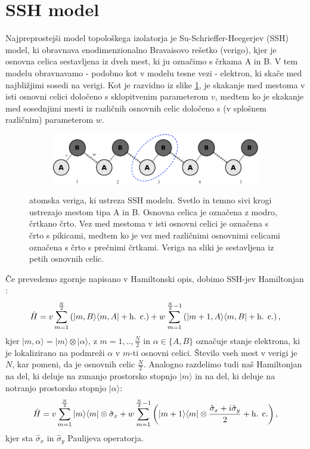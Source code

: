 \section{SSH model}
Najpreprostejši model topološkega izolatorja je Su-Schrieffer-Heegerjev (SSH) model, ki obravnava enodimenzionalno Bravaisovo rešetko (verigo), kjer je osnovna celica sestavljena iz dveh mest, ki ju označimo s črkama A in B. V tem modelu obravnavamo - podobno kot v modelu tesne vezi - elektron, ki skače med najbližjimi sosedi na verigi. Kot je razvidno iz slike \ref{fig:chain}, je skakanje med mestoma v isti osnovni celici določeno s sklopitvenim parameterom $v$, medtem ko je skakanje med sosednjimi mesti iz različnih osnovnih celic določeno s (v splošnem različnim) parameterom $w$.
\begin{figure}[H]
\centering
\begin{subfigure}{.9\textwidth}
\includegraphics[width=\linewidth]{Figures/MySSHChain.pdf}
\end{subfigure}
\caption{atomska veriga, ki ustreza SSH modelu. Svetlo in temno sivi krogi ustrezajo mestom tipa A in B. Osnovna celica je označena z modro, črtkano črto. Vez med mestoma v isti osnovni celici je označena s črto s pikicami, medtem ko je vez med različnimi osnovnimi celicami označena s črto s prečnimi črtkami. Veriga na sliki je sestavljena iz petih osnovnih celic. }
\label{fig:chain}
\end{figure}
Če prevedemo zgornje napisano v Hamiltonski opis, dobimo SSH-jev Hamiltonjan \cite{SSH}:
\begin{equation}
\hat{H} = v \sum_{m=1}^{\frac{N}{2}} \left( |m, B \rangle \langle m, A | + \textup{h. c.} \right) + w \sum_{m=1}^{\frac{N}{2}-1} \left( | m+1, A \rangle \langle m, B | + \textup{h. c.} \right),
\end{equation}
kjer $|m , \alpha \rangle = |m \rangle \otimes | \alpha \rangle$, z $m=1,.., \frac{N}{2}$ in $\alpha \in \{A,B\}$ označuje stanje elektrona, ki je lokalizirano na podmreži $\alpha$ v $m$-ti osnovni celici. Število vseh mest v verigi je $N$, kar pomeni, da je osnovnih celic $\frac{N}{2}$.  Analogno razdelimo tudi naš Hamiltonjan na del, ki deluje na zunanjo prostorsko stopnjo $|m \rangle$ in na del, ki deluje na notranjo prostorsko stopnjo $| \alpha \rangle$:
\begin{equation}
\hat{H} = v \sum_{m=1}^{\frac{N}{2}} |m \rangle \langle m| \otimes \hat{\sigma}_x + w \sum_{m=1}^{\frac{N}{2}-1} \left( | m+1\rangle \langle m | \otimes \frac{\hat{\sigma}_x + i \hat{\sigma}_y}{2} + \textup{h. c.} \right),
\end{equation}
kjer sta $\hat{\sigma}_x$ in $\hat{\sigma}_y$ Paulijeva operatorja.
\newpage
